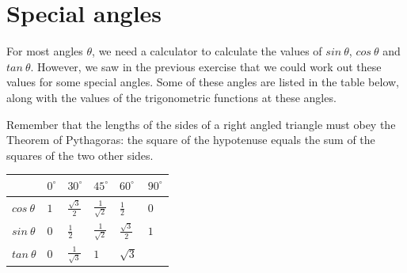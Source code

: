 \section{Special angles}
For most angles $\theta $, we need a calculator to calculate the values of $sin~\theta $, $cos~\theta $ and $tan~\theta $. However, we saw in the previous exercise that we could work out these values for some special angles. Some of these angles are listed in the table below, along with the values of the trigonometric functions at these angles. \par
Remember that the lengths of the sides of a right angled triangle must obey the Theorem of Pythagoras: the square of the hypotenuse equals the sum of the squares of the two other sides.\par 
\begin{table}[H]
\begin{center}

\begin{tabular}{|l|l|l|l|l|l|}\hline
&
${0}^{\circ }$
&
${30}^{\circ }$
&
${45}^{\circ }$
&
${60}^{\circ }$
&
${90}^{\circ }$

\\ \hline
$cos~\theta $
&
$1$ &
$\frac{\sqrt{3}}{2}$
&
$\frac{1}{\sqrt{2}}$
&
$\frac{1}{2}$
&
$0 $

\\ \hline
$sin~\theta $
&
$0$ &
$\frac{1}{2}$
&
$\frac{1}{\sqrt{2}}$
&
$\frac{\sqrt{3}}{2}$
&
$1$ 
\\ \hline
$tan~\theta $
&
$0$ &
$\frac{1}{\sqrt{3}}$
&
$1$ &
$\sqrt{3}$
&

\\ \hline
\end{tabular}
\end{center}
\end{table}
